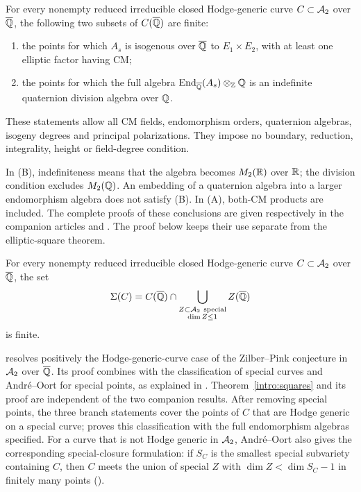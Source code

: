 \begin{theorem}\label{intro:branches}
For every nonempty reduced irreducible closed Hodge-generic curve
$C\subset\mathcal A_2$ over $\overline{\mathbb Q}$, the following two subsets of $C(\overline{\mathbb Q})$
are finite:
\begin{enumerate}[label=\textup{(\Alph*)}]
 \item the points for which $A_s$ is isogenous over $\overline{\mathbb Q}$ to
 $E_1\times E_2$, with at least one elliptic factor having CM;
 \item the points for which the full algebra
 $\operatorname{End}_{\overline{\mathbb Q}}(A_s)\otimes_{\mathbb Z}\mathbb Q$ is an indefinite quaternion division
 algebra over $\mathbb Q$.
\end{enumerate}
These statements allow all CM fields, endomorphism orders, quaternion
algebras, isogeny degrees and principal polarizations. They impose no
boundary, reduction, integrality, height or field-degree condition.
\end{theorem}

In (B), indefiniteness means that the algebra becomes $M_2(\mathbb R)$ over
$\mathbb R$; the division condition excludes $M_2(\mathbb Q)$. An embedding of a
quaternion algebra into a larger endomorphism algebra does not satisfy
(B). In (A), both-CM products are included. The complete proofs of
these conclusions are given respectively in the companion articles
\cite[Theorem~1.1]{CompanionECM} and
\cite[Theorem~1.1]{CompanionQuaternion}. The proof below keeps their
use separate from the elliptic-square theorem.

\begin{theorem}
\label{intro:zp}
For every nonempty reduced irreducible
closed Hodge-generic curve $C\subset\mathcal A_2$ over $\overline{\mathbb Q}$, the set
\[
 \Sigma(C)=C(\overline{\mathbb Q})\cap
 \bigcup_{\substack{Z\subset\mathcal A_2\ \mathrm{special}\mathstrut\\
                     \dim Z\le 1}} Z(\overline{\mathbb Q})
\]
is finite.
\end{theorem}

 resolves positively the Hodge-generic-curve
case of the Zilber--Pink conjecture in $\mathcal A_2$ over $\overline{\mathbb Q}$. Its proof combines
 with the classification of special
curves and Andr\'e--Oort for special points, as explained in
. Theorem~\ref{intro:squares}
and its proof are independent of the two companion results.
After removing special points, the three branch statements cover the
points of $C$ that are Hodge generic on a special curve;
proves this classification with the full endomorphism algebras specified.
For a curve that is not Hodge generic in $\mathcal A_2$, Andr\'e--Oort also gives
the corresponding special-closure formulation: if $S_C$ is the smallest
special subvariety containing $C$, then $C$ meets the union of special
$Z$ with $\dim Z<\dim S_C-1$ in finitely many points
().

